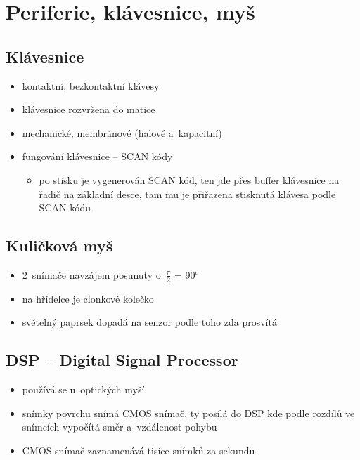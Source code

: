 \documentclass[a4paper,12pt]{article}
\providecommand{\tightlist}{%
\setlength{\itemsep}{0pt}\setlength{\parskip}{0pt}}
\begin{document}
\section{Periferie, klávesnice, myš}

\subsection{Klávesnice}

\begin{itemize}
\tightlist
\item kontaktní, bezkontaktní klávesy
\item klávesnice rozvržena do matice
\item mechanické, membránové (halové a~kapacitní)
\item fungování klávesnice -- SCAN kódy

  \begin{itemize}
  \tightlist
  \item po stisku je vygenerován SCAN kód, ten jde přes buffer klávesnice na
    řadič na základní desce, tam mu je přiřazena stisknutá klávesa podle
    SCAN kódu
  \end{itemize}
\end{itemize}

\subsection{Kuličková myš}

\begin{itemize}
\tightlist
\item 2~snímače navzájem posunuty o~$\frac{\pi}{2}$ = 90°
\item na hřídelce je clonkové kolečko
\item světelný paprsek dopadá na senzor podle toho zda prosvítá
\end{itemize}

\subsection{DSP -- Digital Signal Processor}

\begin{itemize}
\tightlist
\item používá se u~optických myší
\item snímky povrchu snímá CMOS snímač, ty posílá do DSP kde podle rozdílů ve
snímcích vypočítá směr a~vzdálenost pohybu
\item CMOS snímač zaznamenává tisíce snímků za sekundu
\end{itemize}
\end{document}
